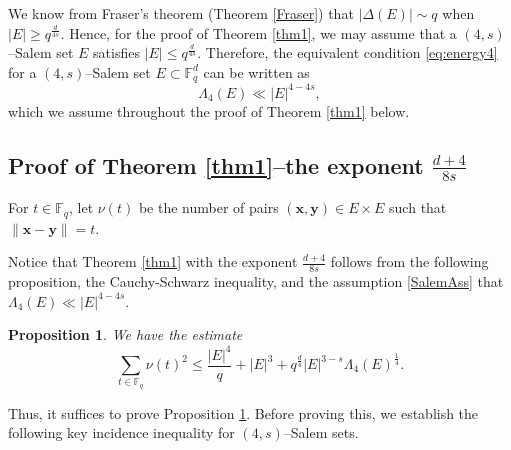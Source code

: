 \documentclass[11pt]{article}
\newtheorem{proposition}[theorem]{Proposition}
\begin{document}
We know from Fraser's theorem (Theorem \ref{Fraser}) that $|\Delta(E)| \sim q$ when $|E| \ge q^{\frac{d}{4s}}$. Hence, for the proof of Theorem \ref{thm1}, we may assume that a $(4, s)$--Salem set $E$ satisfies $|E| \le q^{\frac{d}{4s}}$. Therefore, the equivalent condition \eqref{eq:energy4} for a $(4, s)$--Salem set $E \subset \mathbb{F}_q^d$ can be written as
\begin{equation}\label{SalemAss}
\Lambda_{4}(E) \ll |E|^{4-4s},
\end{equation}
which we assume throughout the proof of Theorem \ref{thm1} below.


\subsection{Proof of Theorem \ref{thm1}--the exponent $\frac{d+4}{8s}$} \label{sec51}
For $t\in \mathbb{F}_q$, let $\nu(t)$ be the number of pairs $(\mathbf{x}, \mathbf{y})\in E\times E$ such that $\|\mathbf{x}-\mathbf{y}\|=t$. 

Notice that Theorem \ref{thm1} with the exponent $\frac{d+4}{8s}$ follows from the following proposition, the Cauchy-Schwarz inequality, and the assumption \eqref{SalemAss} that $\Lambda_4(E)\ll |E|^{4-4s}$.
\begin{proposition}\label{theorem-upper-bound0-nu^2}
We have the estimate
   \[\sum_{t\in \mathbb{F}_q}\nu(t)^2\le \frac{|E|^4}{q}+|E|^3+q^{\frac{d}{4}}|E|^{3-s}\Lambda_4(E)^{\frac{1}{4}}.\]
\end{proposition}
Thus, it suffices to prove Proposition \ref{theorem-upper-bound0-nu^2}. Before proving this, we establish the following key incidence inequality for $(4, s)$--Salem sets.
\end{document}

